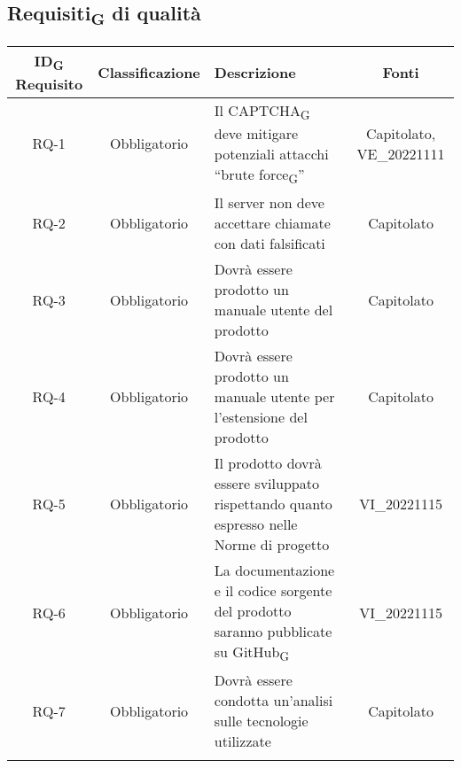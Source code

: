 \subsection{Requisiti\textsubscript{G} di qualità}
\renewcommand\tabularxcolumn[1]{>{\Centering}m{#1}}
\begin{tabularx}{\textwidth}{| c | c | X | c |} 
 \hline
 \textbf{ID\textsubscript{G} Requisito} & \textbf{Classificazione} & \textbf{Descrizione} & \textbf{Fonti} \\
 \hline
 RQ-1 & Obbligatorio & Il CAPTCHA\textsubscript{G} deve mitigare potenziali attacchi “brute force\textsubscript{G}” & Capitolato, VE\_20221111\\
 \hline
  RQ-2 & Obbligatorio & Il server non deve accettare chiamate con dati falsificati & Capitolato\\
 \hline
 RQ-3 & Obbligatorio & Dovrà essere prodotto un manuale utente del prodotto & Capitolato\\
 \hline
 RQ-4 & Obbligatorio & Dovrà essere prodotto un manuale utente per l'estensione del prodotto &  Capitolato\\
 \hline
 RQ-5 & Obbligatorio & Il prodotto dovrà essere sviluppato rispettando quanto espresso nelle Norme di progetto & VI\_20221115\\
 \hline
 RQ-6 & Obbligatorio & La documentazione e il codice sorgente del prodotto saranno pubblicate su GitHub\textsubscript{G} & VI\_20221115\\
 \hline
 RQ-7 & Obbligatorio & Dovrà essere condotta un'analisi sulle tecnologie utilizzate & Capitolato\\
 \hline
 \caption{Requisiti\textsubscript{G} di qualità}
\end{tabularx}

